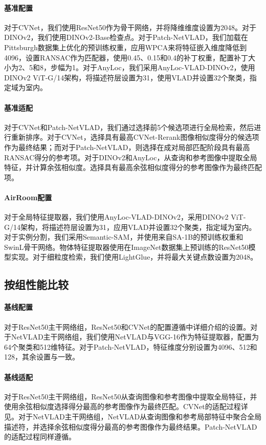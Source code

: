 \paragraph{基准配置} 对于CVNet，我们使用ResNet50作为骨干网络，并将降维维度设置为2048。对于DINOv2，我们使用DINOv2-Base检查点。对于Patch-NetVLAD，我们加载在Pittsburgh数据集上优化的预训练权重，应用WPCA来将特征嵌入维度降低到4096，设置RANSAC作为匹配器，使用0.45、0.15和0.4的补丁权重，配置补丁大小为2、5和8，步幅为1。对于AnyLoc，我们采用AnyLoc-VLAD-DINOv2，使用DINOv2 ViT-G/14架构，将描述符层设置为31，使用VLAD并设置32个聚类，指定域为\mbox{室内}。

\paragraph{基准适配} 对于CVNet和Patch-NetVLAD，我们通过选择前5个候选项进行全局检索，然后进行重新排序。对于CVNet，选择具有最高CVNet-Rerank图像相似度得分的候选项作为最终结果；而对于Patch-NetVLAD，则选择在成对局部匹配阶段具有最高RANSAC得分的参考项。对于DINOv2和AnyLoc，从查询和参考图像中提取全局特征，并计算余弦相似度。选择具有最高余弦相似度得分的参考图像作为最终匹配项。

\paragraph{AirRoom配置} 对于全局特征提取器，我们使用AnyLoc-VLAD-DINOv2，采用DINOv2 ViT-G/14架构，将描述符层设置为31，应用VLAD并设置32个聚类，指定域为室内。对于实例分割，我们采用Semantic-SAM，并使用来自SA-1B的预训练权重和SwinL骨干网络。物体特征提取器使用在ImageNet数据集上预训练的ResNet50模型实现。对于细粒度检索，我们使用LightGlue，并将最大关键点数设置为2048。
\subsection{按组性能比较}

\paragraph{基线配置} 对于ResNet50主干网络组，ResNet50和CVNet的配置遵循中详细介绍的设置。对于NetVLAD主干网络组，我们使用NetVLAD与VGG-16作为特征提取器，配置为64个聚类和512维特征。对于Patch-NetVLAD，特征维度分别设置为4096、512和128，其余设置与一致。

\paragraph{基线适配} 对于ResNet50主干网络组，ResNet50从查询图像和参考图像中提取全局特征，并使用余弦相似度选择得分最高的参考图像作为最终匹配。CVNet的适配过程详见。对于NetVLAD主干网络组，NetVLAD从查询图像和参考局部特征中聚合全局描述符，并选择余弦相似度得分最高的参考图像作为最终结果。Patch-NetVLAD的适配过程同样遵循。

